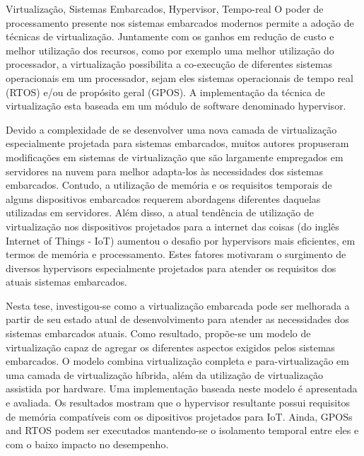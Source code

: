 \documentclass[english,twoside]{pucrs-ppgcc}
\begin{document}
\begin{resumo}{Virtualização, Sistemas Embarcados, Hypervisor, Tempo-real}
\vspace{-3.6cm}
O poder de processamento presente nos sistemas embarcados modernos permite a adoção de técnicas de virtualização. Juntamente com os ganhos em redução de custo e melhor utilização dos recursos, como por exemplo uma melhor utilização do processador, a virtualização possibilita a co-execução de diferentes sistemas operacionais em um processador, sejam eles sistemas operacionais de tempo real (RTOS) e/ou de propósito geral (GPOS). 
A implementação da técnica de virtualização esta baseada em um módulo de software denominado hypervisor. %

Devido a complexidade de se desenvolver uma nova camada de virtualização especialmente projetada para sistemas embarcados, muitos autores propuseram modificações em sistemas de virtualização que são largamente empregados em servidores na nuvem para melhor adapta-los às necessidades dos sistemas embarcados. Contudo, a utilização de memória e os requisitos temporais de alguns dispositivos embarcados requerem abordagens diferentes daquelas utilizadas em servidores. Além disso, a atual tendência de utilização de virtualização nos dispositivos projetados para a internet das coisas (do inglês Internet of Things - IoT) aumentou o desafio por hypervisors mais eficientes, em termos de memória e processamento. Estes fatores motivaram o surgimento de diversos hypervisors especialmente projetados para atender os requisitos dos atuais sistemas embarcados. 

Nesta tese, investigou-se como a virtualização embarcada pode ser melhorada a partir de seu estado atual de desenvolvimento para atender as necessidades dos sistemas embarcados atuais. Como resultado, propõe-se um modelo de virtualização capaz de agregar os diferentes aspectos exigidos pelos sistemas embarcados. O modelo combina virtualização completa e para-virtualização em uma camada de virtualização híbrida, além da utilização de virtualização assistida por hardware. Uma implementação baseada neste modelo é apresentada e avaliada. Os resultados mostram que o hypervisor resultante possui requisitos de memória compatíveis com os dipositivos projetados para IoT. Ainda, GPOSs and RTOS podem ser executados mantendo-se o isolamento temporal entre eles e com o baixo impacto no desempenho. 
\end{resumo}
\end{document}
